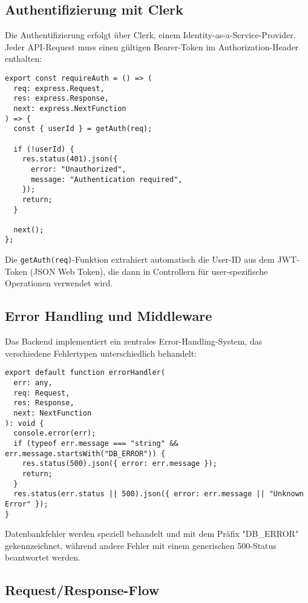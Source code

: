 \subsection{Authentifizierung mit Clerk}

Die Authentifizierung erfolgt über Clerk, einem Identity-as-a-Service-Provider. Jeder API-Request muss einen gültigen Bearer-Token im Authorization-Header enthalten:

\begin{lstlisting}[style=typescriptstyle,caption={Authentifizierungs-Middleware}]
export const requireAuth = () => (
  req: express.Request,
  res: express.Response,
  next: express.NextFunction
) => {
  const { userId } = getAuth(req);

  if (!userId) {
    res.status(401).json({
      error: "Unauthorized",
      message: "Authentication required",
    });
    return;
  }

  next();
};
\end{lstlisting}

Die \texttt{getAuth(req)}-Funktion extrahiert automatisch die User-ID aus dem JWT-Token (JSON Web Token), die dann in Controllern für user-spezifische Operationen verwendet wird.

\subsection{Error Handling und Middleware}

Das Backend implementiert ein zentrales Error-Handling-System, das verschiedene Fehlertypen unterschiedlich behandelt:

\begin{lstlisting}[style=typescriptstyle,caption={Zentraler Error Handler}]
export default function errorHandler(
  err: any,
  req: Request,
  res: Response,
  next: NextFunction
): void {
  console.error(err);
  if (typeof err.message === "string" && err.message.startsWith("DB_ERROR")) {
    res.status(500).json({ error: err.message });
    return;
  }
  res.status(err.status || 500).json({ error: err.message || "Unknown Error" });
}
\end{lstlisting}

Datenbankfehler werden speziell behandelt und mit dem Präfix "DB\_ERROR" gekennzeichnet, während andere Fehler mit einem generischen 500-Status beantwortet werden.

\subsection{Request/Response-Flow}

